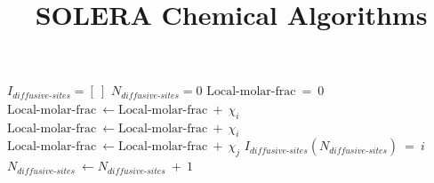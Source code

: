 \documentclass{article}
\title{SOLERA Chemical Algorithms}
\date{}
\begin{document}
\maketitle


\begin{algorithm}
    \caption{List of diffusive sites}\label{alg:diffusive-sites}
    \begin{algorithmic}
    \State $I_{\textit{diffusive-sites}} = [\ ]$
    \State $N_{\textit{diffusive-sites}} = 0$
    \vspace{0.2cm}  
        \vspace{0.2cm}  
        \State $\text{Local-molar-frac}\ =\ 0$
        \vspace{0.2cm}  
            \State $\text{Local-molar-frac}\ \gets \text{Local-molar-frac}\ +\ \chi_i$ 
        \EndIf
        \vspace{0.2cm}        
        \State $\text{Local-molar-frac}\ \gets \text{Local-molar-frac}\ +\ \chi_i$ 
                \State $\text{Local-molar-frac}\ \gets \text{Local-molar-frac}\ +\ \chi_j$ 
            \EndIf
       \EndFor
        \vspace{0.2cm}     
            \State $I_{\textit{diffusive-sites}} (N_{\textit{diffusive-sites}})\ =\ i$
            \State $N_{\textit{diffusive-sites}}\ \gets N_{\textit{diffusive-sites}}\ +\ 1$ 
        \EndIf
    \EndFor
    \end{algorithmic}
    \end{algorithm}
    
    
\end{document}
